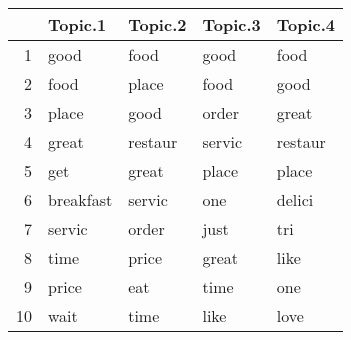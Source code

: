 \begin{tabular}{rllll}
  \hline
 & Topic.1 & Topic.2 & Topic.3 & Topic.4 \\ 
  \hline
1 & good & food & good & food \\ 
  2 & food & place & food & good \\ 
  3 & place & good & order & great \\ 
  4 & great & restaur & servic & restaur \\ 
  5 & get & great & place & place \\ 
  6 & breakfast & servic & one & delici \\ 
  7 & servic & order & just & tri \\ 
  8 & time & price & great & like \\ 
  9 & price & eat & time & one \\ 
  10 & wait & time & like & love \\ 
   \hline
\end{tabular}
